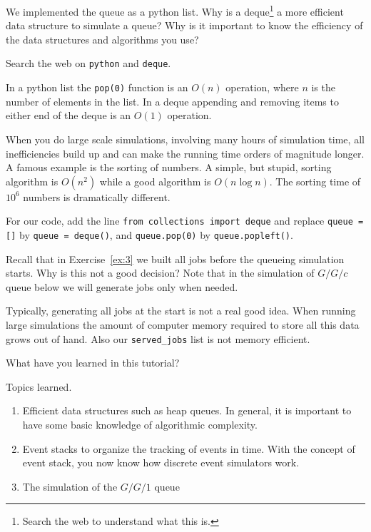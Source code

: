 \documentclass{scrartcl}
\begin{document}
\begin{exercise}

  We implemented the queue as a python list. Why is a deque\footnote{Search the web to understand what this is.} a more efficient data structure to simulate a queue?  Why is it important to know the efficiency of the data structures and algorithms you use?
  \hintsymbol\begin{hint}
  Search the web on \texttt{python} and \texttt{deque}.
  \end{hint}
  \begin{solution}
    In a python list the \texttt{pop(0)} function is an $O(n)$ operation, where $n$ is the number of elements in the list. In a deque appending and removing items to either end of the deque is an $O(1)$ operation.

When you do large scale simulations, involving many hours of simulation time, all inefficiencies build up and can make the running time orders of magnitude longer. A famous example is the sorting of numbers. A simple, but stupid, sorting algorithm is $O(n^2)$ while a good algorithm is $O(n \log n)$. The sorting time of $10^6$ numbers is dramatically different. 

    For our code, add the line \texttt{from collections import deque} and replace \texttt{queue = []} by \texttt{queue = deque()}, and \texttt{queue.pop(0)}  by \texttt{queue.popleft()}.
  \end{solution}
\end{exercise}

\begin{exercise}
  Recall that in Exercise~\ref{ex:3} we built all jobs before the queueing simulation starts. Why is this not a good decision? Note that in the simulation of $G/G/c$ queue below we will generate jobs only when needed. 
  \begin{solution}
    Typically, generating all jobs at the start is not a real good idea. When running large simulations the amount of computer memory required to store all this data grows out of hand. Also our \texttt{served\_jobs} list is not memory efficient. 
  \end{solution}
\end{exercise}




\begin{exercise}
  What have you learned in this tutorial?
  \begin{solution}
    Topics learned.
    \begin{enumerate}
    \item Efficient data structures such as heap queues. In general, it is important to have some basic knowledge of algorithmic complexity. 
    \item Event stacks to organize the tracking of events in time. With the concept of event stack, you now know how discrete event simulators work. 
    \item The simulation of the $G/G/1$ queue
    \end{enumerate}
  \end{solution}
\end{exercise}
\end{document}

